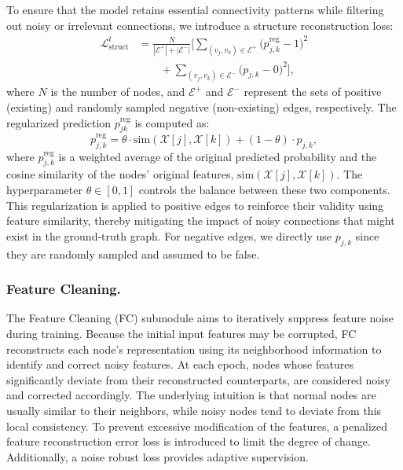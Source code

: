 \documentclass[sigconf, anonymous, review]{acmart}
\begin{document}
      To ensure that the model retains essential connectivity patterns while filtering out noisy or irrelevant connections, we introduce a structure reconstruction loss:
      \begin{equation}
        \begin{aligned}
          \mathcal{L}^t_{\text{struct}}
          &= \frac{N}{|\mathcal{E}^+| + |\mathcal{E}^-|}
          \Biggl[
            \sum_{(v_j,v_k) \in \mathcal{E}^+}
            \bigl( p_{j,k}^{\text{reg}} - 1 \bigr)^2 \\
          &\qquad
            + \sum_{(v_j,v_k) \in \mathcal{E}^-}
            \bigl( p_{j,k} - 0 \bigr)^2
          \Biggr],
        \end{aligned}
      \end{equation}
      where $N$ is the number of nodes, and $\mathcal{E}^+$ and $\mathcal{E}^-$  represent the sets of positive (existing) and randomly sampled negative (non-existing) edges, respectively.
      The regularized prediction $p_{jk}^{\text{reg}}$ is computed as:
      \begin{equation}
        p_{j,k}^{\text{reg}} = \theta \cdot \text{sim}(\mathcal{X}[j], \mathcal{X}[k]) + (1 - \theta) \cdot p_{j,k},
      \end{equation}
      where $p_{j,k}^{\text{reg}}$  is a weighted average of the original predicted probability and the cosine similarity of the nodes' original features,  $\text{sim}(\mathcal{X}[j], \mathcal{X}[k])$. The hyperparameter  $\theta \in [0,1]$
      controls the balance between these two components.
      This regularization is applied to positive edges to reinforce their validity using feature similarity, thereby mitigating the impact of noisy connections that might exist in the ground-truth graph. For negative edges, we directly use 
      $p_{j,k}$ since they are randomly sampled and assumed to be false. 

    \subsubsection{Feature Cleaning.}
      The Feature Cleaning (FC) submodule aims to iteratively suppress feature noise during training. Because the initial input features may be corrupted, FC reconstructs each node’s representation using its neighborhood information to identify and correct noisy features. At each epoch, nodes whose features significantly deviate from their reconstructed counterparts,  are considered noisy and corrected accordingly.  The underlying intuition is that normal nodes are usually similar to their neighbors, while noisy nodes tend to deviate from this local consistency.
      To prevent excessive modification of the features, a penalized feature reconstruction error loss is introduced to limit the degree of change. Additionally, a noise robust loss provides adaptive supervision.
\end{document}
